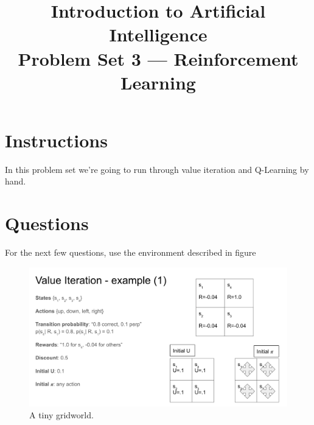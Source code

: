 \documentclass{article} %
\title{Introduction to Artificial Intelligence\\ %
Problem Set 3 --- Reinforcement Learning}
\date{} %
\author{}
\begin{document}
\maketitle %

\newcommand{\bphnote}[1]{\textit{\textcolor{red}{#1}}}


\section*{Instructions} %
In this problem set we're going to run through value iteration and Q-Learning by hand. 

\section*{Questions}
For the next few questions, use the environment described in figure \
\begin{figure}
\begin{center}
\includegraphics[height=0.3\textheight]{2x2-gridworld}
\caption{A tiny gridworld.}
\label{2x2-gridworld}
\end{center}
\end{figure}
\end{document}
